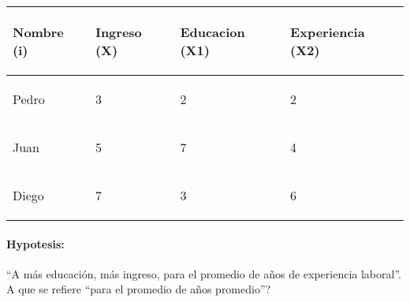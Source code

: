 \documentclass[10pt]{article}
\begin{document}
\begin{table}[!h]
        \centering
        
\begin{tabular}{|p{}|p{}|p{}|p{}|}
\hline 
 \begin{center}
\textbf{Nombre (i)}
\end{center}
 & \begin{center}
\textbf{Ingreso (X)}
\end{center}
 & \begin{center}
\textbf{Educacion (X1)}
\end{center}
 & \begin{center}
\textbf{Experiencia (X2)}
\end{center}
 \\
\hline 
 \begin{center}
Pedro
\end{center}
 & \begin{center}
3
\end{center}
 & \begin{center}
2
\end{center}
 & \begin{center}
2
\end{center}
 \\
\hline 
 \begin{center}
Juan
\end{center}
 & \begin{center}
5
\end{center}
 & \begin{center}
7
\end{center}
 & \begin{center}
4
\end{center}
 \\
\hline 
 \begin{center}
Diego
\end{center}
 & \begin{center}
7
\end{center}
 & \begin{center}
3
\end{center}
 & \begin{center}
6
\end{center}
 \\
 \hline
\end{tabular}
        
        \end{table}


\paragraph{Hypotesis:} ``A m\'as educaci\'on, m\'as ingreso, para el promedio de a\~nos de experiencia laboral''. {\color{red}A que se refiere ``para el promedio de a\~nos promedio''?}
\end{document}
